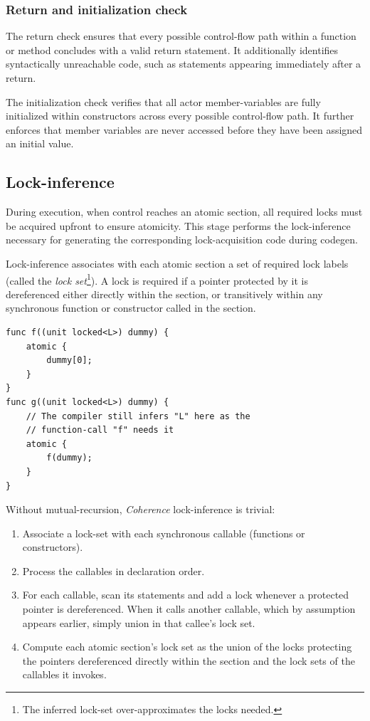 \subsubsection*{Return and initialization check}
The return check ensures that every possible control-flow path within a function or method concludes with a valid return statement. It additionally identifies syntactically unreachable code, such as statements appearing immediately after a return.

The initialization check verifies that all actor member-variables are fully initialized within constructors across every possible control-flow path. It further enforces that member variables are never accessed before they have been assigned an initial value.

\subsection{Lock-inference}
During execution, when control reaches an atomic section, all required locks must be acquired upfront to ensure atomicity. This stage performs the lock-inference necessary for generating the corresponding lock-acquisition code during codegen.

Lock-inference associates with each atomic section a set of required lock labels (called the \textit{lock set}\footnote{The inferred lock-set over-approximates the locks needed.}). A lock is required if a pointer protected by it is dereferenced either directly within the section, or transitively within any synchronous function or constructor called in the section.

\begin{verbatim}
func f((unit locked<L>) dummy) {
    atomic {
        dummy[0];
    }
}
func g((unit locked<L>) dummy) {
    // The compiler still infers "L" here as the
    // function-call "f" needs it 
    atomic {
        f(dummy);
    }
}
\end{verbatim}

Without mutual-recursion, \textit{Coherence} lock-inference is trivial:
\begin{enumerate}
\item Associate a lock-set with each synchronous callable (functions or constructors).
\item Process the callables in declaration order.
\item For each callable, scan its statements and add a lock whenever a protected pointer is dereferenced. When it calls another callable, which by assumption appears earlier, simply union in that callee's lock set.
\item Compute each atomic section's lock set as the union of the locks protecting the pointers dereferenced directly within the section and the lock sets of the callables it invokes.
\end{enumerate}

